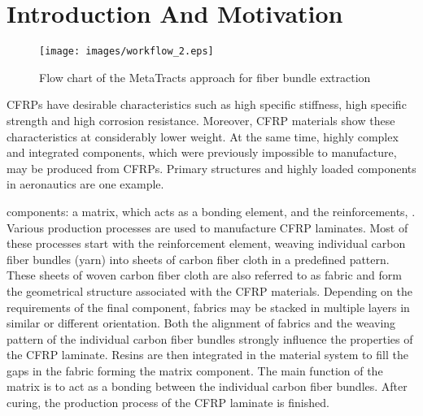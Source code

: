 \section{Introduction And Motivation}\label{sec:intro}
\begin{figure*}[tb]
	\centering
	\texttt{[image: images/workflow\_2.eps]}
	\caption{Flow chart of the MetaTracts approach for fiber bundle extraction}
	\label{fig:flowchart}
\end{figure*}
 CFRPs have desirable characteristics such as high specific stiffness, high specific strength and high corrosion resistance. Moreover, CFRP materials show these characteristics at considerably lower weight. At the same time, highly complex and integrated components, which were previously impossible to manufacture, may be produced from CFRPs. Primary structures and highly loaded components in aeronautics are one example.
 
 components: a matrix, which acts as a bonding element, and the reinforcements, . Various production processes are used to manufacture CFRP laminates. Most of these processes start with the reinforcement element, weaving individual carbon fiber bundles (yarn) into sheets of carbon fiber cloth in a predefined pattern. These sheets of woven carbon fiber cloth are also referred to as fabric and form the geometrical structure associated with the CFRP materials. Depending on the requirements of the final component, fabrics may be stacked in multiple layers in similar or different orientation. Both the  alignment of fabrics and the weaving pattern of the individual carbon fiber bundles strongly influence the properties of the CFRP laminate. Resins are then integrated in the material system to fill the gaps in the fabric forming the matrix component. The main function of the matrix is to act as a bonding between the individual carbon fiber bundles. After curing, the production process of the CFRP laminate is finished.

